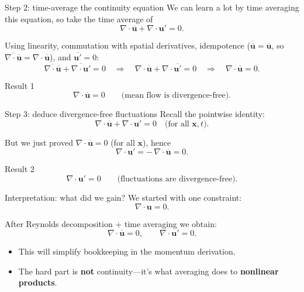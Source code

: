 \documentclass[aspectratio=169,11pt]{beamer}
\newcommand{\uu}{\bm{u}}
\newcommand{\x}{\bm{x}}
\newcommand{\avg}[1]{\overline{#1}}
\renewcommand{\up}{\uu'} %
\newcommand{\ubar}{\avg{\uu}}
\begin{document}
\begin{frame}{Step 2: time-average the continuity equation}
We can learn a lot by time averaging this equation, so take the time average of
\[
\nabla\cdot\ubar + \nabla\cdot\up = 0.
\]

Using linearity, commutation with spatial derivatives, idempotence ($\avg{\ubar}=\ubar$, so $\avg{\nabla\cdot\ubar}=\nabla\cdot\ubar$), and $\avg{\up}=0$:
\[
\avg{\nabla\cdot\ubar} + \avg{\nabla\cdot\up} = 0
\quad\Rightarrow\quad
\nabla\cdot\ubar + \nabla\cdot\avg{\up}=0
\quad\Rightarrow\quad
\nabla\cdot\ubar = 0.
\]

\begin{block}{Result 1}
\[
\nabla\cdot\ubar = 0 \qquad\text{(mean flow is divergence-free).}
\]
\end{block}

\end{frame}

\begin{frame}{Step 3: deduce divergence-free fluctuations}
Recall the pointwise identity:
\[
\nabla\cdot\ubar + \nabla\cdot\up = 0 \quad\text{(for all $\x,t$)}.
\]

But we just proved $\nabla\cdot\ubar=0$ (for all $\x$), hence
\[
\nabla\cdot\up = -\,\nabla\cdot\ubar = 0.
\]

\begin{block}{Result 2}
\[
\nabla\cdot\up = 0 \qquad\text{(fluctuations are divergence-free).}
\]
\end{block}

\end{frame}

\begin{frame}{Interpretation: what did we gain?}
We started with one constraint:
\[
\nabla\cdot\uu = 0.
\]

After Reynolds decomposition + time averaging we obtain:
\[
\nabla\cdot\ubar = 0,
\qquad
\nabla\cdot\up = 0.
\]

\begin{itemize}
  \item This will simplify bookkeeping in the momentum derivation.
  \item The hard part is \textbf{not} continuity---it’s what averaging does to \textbf{nonlinear products}.
\end{itemize}


\end{frame}
\end{document}
